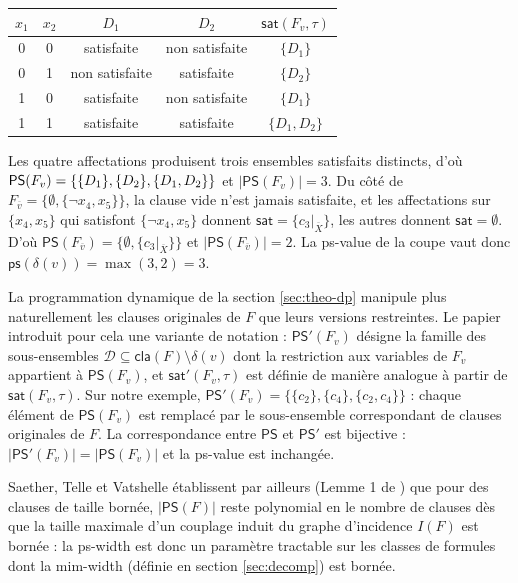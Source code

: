 \documentclass[11pt,a4paper]{report}
\theoremstyle{plain}
\theoremstyle{definition}
\begin{document}
\begin{center}
\begin{tabular}{cc|cc|c}
\hline
$x_1$ & $x_2$ & $D_1$ & $D_2$ & $\mathsf{sat}(F_v, \tau)$ \\
\hline
0 & 0 & satisfaite & non satisfaite & $\{D_1\}$ \\
0 & 1 & non satisfaite & satisfaite & $\{D_2\}$ \\
1 & 0 & satisfaite & non satisfaite & $\{D_1\}$ \\
1 & 1 & satisfaite & satisfaite & $\{D_1, D_2\}$ \\
\hline
\end{tabular}
\end{center}

Les quatre affectations produisent trois ensembles satisfaits distincts,
d'où $\mathsf{PS}(F_v) = \{\{D_1\}, \\ \{D_2\}, \{D_1, D_2\}\}$ et
$|\mathsf{PS}(F_v)| = 3$. Du côté de
$F_{\overline{v}} = \{\emptyset, \{\neg x_4, x_5\}\}$, la clause vide
n'est jamais satisfaite, et les affectations sur $\{x_4, x_5\}$ qui
satisfont $\{\neg x_4, x_5\}$ donnent
$\mathsf{sat} = \{c_3|_{\overline{X}}\}$, les autres donnent
$\mathsf{sat} = \emptyset$. D'où
$\mathsf{PS}(F_{\overline{v}}) = \{\emptyset, \{c_3|_{\overline{X}}\}\}$
et $|\mathsf{PS}(F_{\overline{v}})| = 2$. La ps-value de la coupe vaut
donc $\mathsf{ps}(\delta(v)) = \max(3, 2) = 3$.

La programmation dynamique de la section \ref{sec:theo-dp} manipule
plus naturellement les clauses originales de $F$ que leurs versions
restreintes. Le papier introduit pour cela une variante de notation :
$\mathsf{PS}'(F_v)$ désigne la famille des sous-ensembles
$\mathcal{D} \subseteq \mathsf{cla}(F) \setminus \delta(v)$ dont la
restriction aux variables de $F_v$ appartient à $\mathsf{PS}(F_v)$, et
$\mathsf{sat}'(F_v, \tau)$ est définie de manière analogue à partir de
$\mathsf{sat}(F_v, \tau)$. Sur notre exemple,
$\mathsf{PS}'(F_v) = \{\{c_2\}, \{c_4\}, \{c_2, c_4\}\}$ : chaque
élément de $\mathsf{PS}(F_v)$ est remplacé par le sous-ensemble
correspondant de clauses originales de $F$. La correspondance entre
$\mathsf{PS}$ et $\mathsf{PS}'$ est bijective :
$|\mathsf{PS}'(F_v)| = |\mathsf{PS}(F_v)|$ et la ps-value est
inchangée.

Saether, Telle et Vatshelle établissent par ailleurs (Lemme 1 de
\cite{saether2015}) que pour des clauses de taille bornée,
$|\mathsf{PS}(F)|$ reste polynomial en le nombre de clauses dès que la
taille maximale d'un couplage induit du graphe d'incidence $I(F)$ est
bornée : la ps-width est donc un paramètre tractable sur les classes
de formules dont la mim-width (définie en section \ref{sec:decomp})
est bornée.
\end{document}
